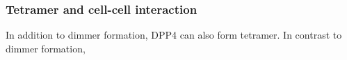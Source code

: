 \subsubsection{Tetramer and cell-cell interaction}

In addition to dimmer formation, DPP4 can also form tetramer. In contrast to dimmer formation, 